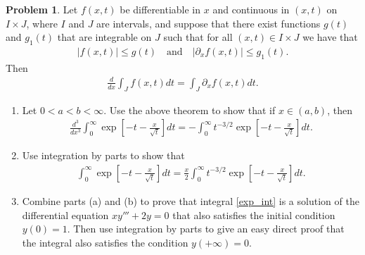\documentclass[12pt]{article}
\theoremstyle{definition}
\newtheorem{problem}{Problem}
\begin{document}
\begin{problem}
  Let $f(x, t)$ be differentiable in $x$ and continuous in $(x, t)$ on $I \times J$,
  where $I$ and $J$ are intervals, and suppose that there exist functions $g(t)$ and $g_1(t)$
  that are integrable on $J$ such that for all $(x,t) \in I \times J$ we have that
  \begin{align*}
    |f(x,t)|\leq g(t) \quad \text{and} \quad |\partial_x f(x,t)| \leq g_1(t).
  \end{align*}
  Then
  \begin{align*}
    \frac{d}{dx} \int_J f(x,t) dt = \int_J \partial_x f(x,t) dt.
  \end{align*}
  \begin{enumerate}
    \item Let $0 < a < b < \infty$. Use the above theorem to show that if $x \in (a,b)$, then
      \begin{align*}
        \frac{d^3}{dx^3} \int_0^\infty \exp\left[-t - \frac{x}{\sqrt{t}}\right] dt = -\int_0^\infty t^{-3/2}\exp\left[-t - \frac{x}{\sqrt{t}}\right] dt.
      \end{align*}
    \item Use integration by parts to show that
      \begin{align*}
        \int_0^\infty \exp\left[-t - \frac{x}{\sqrt{t}}\right] dt = \frac{x}{2}\int_0^\infty t^{-3/2}\exp\left[-t - \frac{x}{\sqrt{t}}\right] dt.
      \end{align*}
    \item Combine parts (a) and (b) to prove that integral \eqref{exp_int} is a solution of the
      differential equation $xy''' + 2y = 0$ that also satisfies the initial condition $y(0) = 1$.
      Then use integration by parts to give an easy direct proof that the integral also satisfies
      the condition $y(+\infty) = 0$.
  \end{enumerate}
\end{problem}
\end{document}
